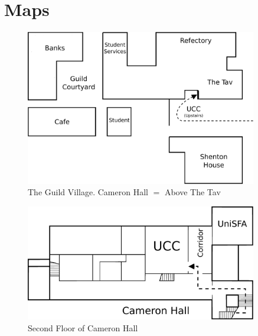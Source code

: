 \label{FindClubroom}



\section{Maps}

\begin{figure}[H]
	\centering
	\includegraphics[width=0.9\textwidth]{figures/OutsideMap.eps}
	\caption{The Guild Village. Cameron Hall $=$ Above The Tav}
	\label{OutsideMap.eps}
\end{figure}

\begin{figure}[H]
	\centering
	\includegraphics[width=0.9\textwidth]{figures/CamHallMap.eps}
	\caption{Second Floor of Cameron Hall}
	\label{CamHallMap.eps}
\end{figure}

\pagebreak


